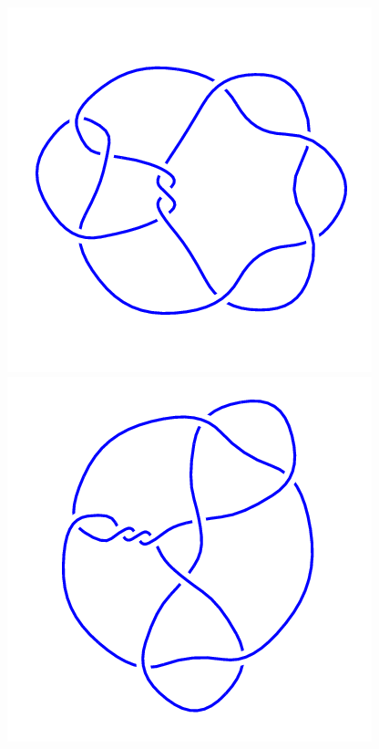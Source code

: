\begin{figure}[H]
	\begin{minipage}[b]{.18\linewidth}
		\centering
		\includegraphics[width=\linewidth]{../data/10_62.png}
	\end{minipage}
	\begin{minipage}[b]{.18\linewidth}
		\centering
		\includegraphics[width=\linewidth]{../data/10_63.png}

\end{minipage}
\end{figure}
